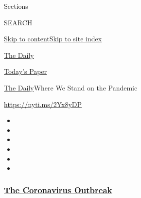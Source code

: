 Sections

SEARCH

\protect\hyperlink{site-content}{Skip to
content}\protect\hyperlink{site-index}{Skip to site index}

\href{https://www.nytimes3xbfgragh.onion/podcasts/the-daily}{The Daily}

\href{https://myaccount.nytimes3xbfgragh.onion/auth/login?response_type=cookie\&client_id=vi}{}

\href{https://www.nytimes3xbfgragh.onion/section/todayspaper}{Today's
Paper}

\href{/podcasts/the-daily}{The Daily}\textbar{}Where We Stand on the
Pandemic

\url{https://nyti.ms/2Yx8yDP}

\begin{itemize}
\item
\item
\item
\item
\item
\item
\end{itemize}

\hypertarget{the-coronavirus-outbreak}{%
\subsubsection{\texorpdfstring{\href{https://www.nytimes3xbfgragh.onion/news-event/coronavirus?name=styln-coronavirus-national\&region=TOP_BANNER\&block=storyline_menu_recirc\&action=click\&pgtype=Article\&impression_id=209f3f10-f1ea-11ea-82b9-9bc3e682e067\&variant=undefined}{The
Coronavirus
Outbreak}}{The Coronavirus Outbreak}}\label{the-coronavirus-outbreak}}

